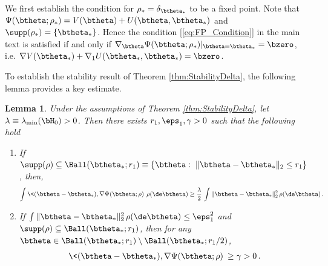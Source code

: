 \documentclass[11pt]{article}
\newtheorem{lemma}{Lemma}
\begin{document}
We first establish the condition for $\rho_*=\delta_{\btheta_*}$ to be a fixed point. Note that
$\Psi(\btheta;\rho_*) = V(\btheta)+U(\btheta,\btheta_*)$ and $\supp(\rho_*)=\{\btheta_*\}$.
Hence the condition [\ref{eq:FP_Condition}] in the main text is satisfied if and only if  $\nabla_\btheta \Psi(\btheta;\rho_*)|_{\btheta=\btheta_*}=\bzero$,
i.e. $\nabla V(\btheta_*)+\nabla_1 U(\btheta_*,\btheta_*)=\bzero$.

To establish the stability result of Theorem \ref{thm:StabilityDelta}, the following lemma provides a key estimate.
%
\begin{lemma}\label{lemma:Stability}
Under the assumptions of Theorem \ref{thm:StabilityDelta},
let $\lambda\equiv \lambda_{\min}(\bH_0)>0$. Then there exists $r_1, \eps_1, \gamma > 0$ such that the following hold

\begin{enumerate}
%
\item[$(i)$] If  $\supp(\rho)\subseteq \Ball(\btheta_*;r_1)
\equiv \{\btheta:\; \|\btheta-\btheta_*\|_2\le r_1\}$, then,
%
\begin{align}
%
\int \<(\btheta-\btheta_*),\nabla\Psi(\btheta;\rho)\> \, \rho(\de\btheta)\ge \frac{\lambda}{2}\, \int \|\btheta-\btheta_*\|_2^2\, \rho(\de\btheta)\, .
\label{eq:2normContraction}
%
\end{align}
%
\item[$(ii)$] If $\int \|\btheta-\btheta_*\|_2^2\,\rho(\de\btheta)\le \eps^2_1$ and $\supp(\rho)\subseteq \Ball(\btheta_*;r_1)$, then for any $\btheta \in \Ball(\btheta_*;r_1)\setminus \Ball(\btheta_*;r_1/2)$, 
\begin{align}
%
\<(\btheta-\btheta_*),\nabla\Psi(\btheta;\rho)\> \ge \gamma>0\, .\label{eq:NoEscape}
%
\end{align}
%
\end{enumerate}
%
\end{lemma}
%
\end{document}
